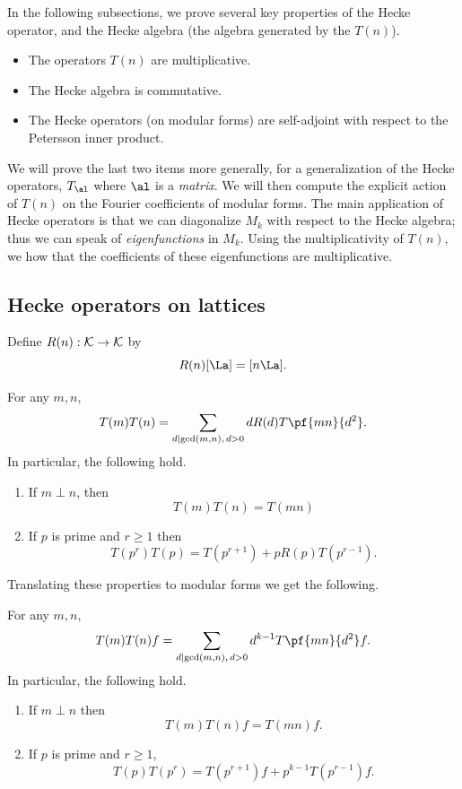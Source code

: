 
In the following subsections, we prove several key properties of the Hecke operator, and the Hecke algebra (the algebra generated by the $T(n)$).
\begin{itemize}
\item
The operators $T(n)$ are multiplicative.
\item
The Hecke algebra is commutative.
\item
The Hecke operators (on modular forms) are self-adjoint with respect to the Petersson inner product.
\end{itemize}
We will prove the last two items more generally, for a generalization of the Hecke operators, $T_{\al}$ where $\al$ is a {\it matrix}. We will then compute the explicit action of $T(n)$ on the Fourier coefficients of modular forms. The main application of Hecke operators is that we can diagonalize $M_k$ with respect to the Hecke algebra; thus we can speak of {\it eigenfunctions} in $M_k$. Using the multiplicativity of $T(n)$, we how that the coefficients of these eigenfunctions are multiplicative.
\subsection{Hecke operators on lattices}
\begin{df}
Define $R(n):\cal K\to \cal K$ by
\[
R(n)[\La]=[n\La].
\]
\end{df}
\begin{thm}
For any $m,n$,
\[
T(m)T(n)=\sum_{d\mid \gcd(m,n),\,d>0} dR(d)T\pf{mn}{d^2}.
\]
In particular, the following hold.
\begin{enumerate}
\item
If $m\perp n$, then
\[
T(m)T(n)=T(mn)
\]
\item If $p$ is prime and $r\ge 1$ then
\[
T(p^r)T(p)=T(p^{r+1})+pR(p)T(p^{r-1}).
\]
\end{enumerate}
\end{thm}
Translating these properties to modular forms we get the following.
\begin{thm}
For any $m,n$,
\[
T(m)T(n)f=\sum_{d\mid \gcd(m,n),\,d>0} d^{k-1} T\pf{mn}{d^2}f.
\]
In particular, the following hold.
\begin{enumerate}
\item
If $m\perp n$ then 
\[
T(m)T(n)f=T(mn)f.
\]
\item 
If $p$ is prime and $r\ge 1$,
\[
T(p)T(p^r)=T(p^{r+1})f+p^{k-1}T(p^{r-1})f.
\]
\end{enumerate}
\end{thm}
